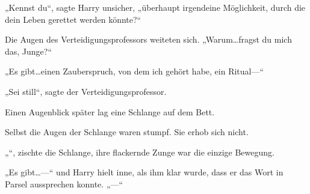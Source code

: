  „Kennst du“, sagte Harry unsicher, „überhaupt irgendeine Möglichkeit, durch die dein Leben gerettet werden könnte?“

Die Augen des Verteidigungsprofessors weiteten sich.
„Warum…fragst du mich das, Junge?“

„Es gibt…einen Zauberspruch, von dem ich gehört habe, ein Ritual—“

„Sei still“, sagte der Verteidigungsprofessor.

Einen Augenblick später lag eine Schlange auf dem Bett.

Selbst die Augen der Schlange waren stumpf. Sie erhob sich nicht.

„“, zischte die Schlange, ihre flackernde Zunge war die einzige Bewegung.

„Es gibt…—“ und Harry hielt inne, als ihm klar wurde, dass er das Wort in Parsel aussprechen konnte.
„—“


